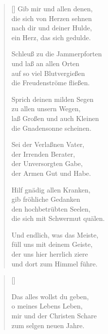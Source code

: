 \begin{multicols}{2}
\begin{verse}[\versewidth]
 Gib mir und allen denen,\\
die sich von Herzen sehnen\\
nach dir und deiner Hulde,\\
ein Herz, das sich gedulde.
 
 Schleuß zu die Jammerpforten\\
und laß an allen Orten\\
auf so viel Blutvergießen\\
die Freudenströme fließen.
 
 Sprich deinen milden Segen\\
zu allen unsern Wegen,\\
laß Großen und auch Kleinen\\
die Gnadensonne scheinen.
 
 Sei der Verlaßnen Vater,\\
der Irrenden Berater,\\
der Unversorgten Gabe,\\
der Armen Gut und Habe.
 
 Hilf gnädig allen Kranken,\\
gib fröhliche Gedanken\\
den hochbetrübten Seelen,\\
die sich mit Schwermut quälen.
 
 Und endlich, was das Meiste,\\
füll uns mit deinem Geiste,\\
der uns hier herrlich ziere\\
und dort zum Himmel führe.

\end{verse}
\end{multicols}




\begin{center}
\settowidth{\versewidth}{Der, vor dem die Welt erschrickt,}
\begin{verse}[\versewidth]




 Das alles wollst du geben,\\
o meines Lebens Leben,\\
mir und der Christen Schare\\
zum selgen neuen Jahre.



  
\end{verse}
\end{center}

